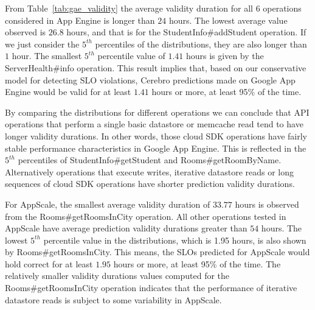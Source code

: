 
From Table~\ref{tab:gae_validity} 
the average validity duration for all 6 operations considered in App Engine is
longer than $24$ hours. The lowest average value observed is $26.8$ hours, 
and that is for the StudentInfo\#addStudent operation. If we
just consider the $5^{th}$ percentiles of the distributions, they are 
also longer than $1$ hour. The smallest $5^{th}$ percentile value of 
$1.41$ hours is 
given by the ServerHealth\#info operation. This result implies that, based on
our conservative model for detecting SLO violations,
Cerebro predictions made on Google App Engine would be valid for at least
$1.41$ hours or more, at least 95\% of the time.

By comparing the distributions for different operations we can conclude that
API operations that perform a single basic datastore or memcache read tend to
have longer validity durations. In other words, those cloud SDK operations have
fairly stable performance characteristics in Google App Engine. 
This is reflected in
the $5^{th}$ percentiles of StudentInfo\#getStudent and Rooms\#getRoomByName. 
Alternatively
operations that execute writes, iterative datastore reads or long sequences of cloud SDK
operations have shorter prediction validity durations.

For AppScale, 
the smallest average validity duration of $33.77$ hours is observed from the
Rooms\#getRoomsInCity operation. All other operations tested in 
AppScale have average prediction validity durations greater
than $54$ hours. The lowest $5^{th}$ percentile value in the 
distributions, which is 1.95 hours, is 
also shown by Rooms\#getRoomsInCity. This means, the SLOs predicted for
AppScale would hold correct for at least $1.95$ hours or more, 
at least 95\% of the time.
The relatively smaller validity durations values computed for the
Rooms\#getRoomsInCity operation indicates that the performance of 
iterative datastore reads is subject to some variability 
in AppScale.

